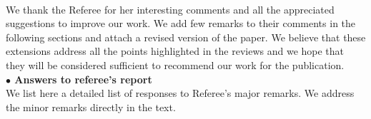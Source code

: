 \documentclass{article}
\begin{document}
\\

\noindent
We thank the Referee for her interesting comments and all the appreciated suggestions to improve our work. We add few remarks to their comments in the following sections and attach a revised version of the paper. We believe that these extensions address all the points highlighted in the reviews and we hope that they will be considered sufficient to recommend our work for the publication.\\

{\bf $\bullet$ Answers to referee's report}\\

We list here a detailed list of responses to Referee's major remarks. We address the minor remarks directly in the text.
\end{document}
